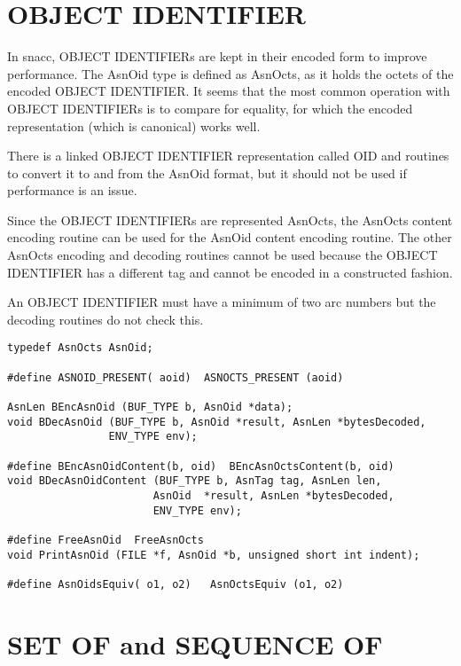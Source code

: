 \section{\label{oid-C-section}OBJECT IDENTIFIER}

In snacc, OBJECT IDENTIFIERs are kept in their encoded form to improve
performance.  The {\C AsnOid} type is defined as {\C AsnOcts}, as
it holds the octets of the encoded OBJECT IDENTIFIER\@.  It seems that
the most common operation with OBJECT IDENTIFIERs is to compare for
equality, for which the encoded representation (which is canonical)
works well.

There is a linked OBJECT IDENTIFIER representation called {\C OID}
and routines to convert it to and from the {\C AsnOid} format, but it
should not be used if performance is an issue.

Since the OBJECT IDENTIFIERs are represented {\C AsnOcts}, the
{\C AsnOcts} content encoding routine can be used for the
{\C AsnOid} content encoding routine.  The other {\C AsnOcts}
encoding and decoding routines cannot be used because the OBJECT
IDENTIFIER has a different tag and cannot be encoded in a constructed
fashion.

An OBJECT IDENTIFIER must have a minimum of two arc numbers but the
decoding routines do not check this.

\begin{small}
\begin{verbatim}
typedef AsnOcts AsnOid;

#define ASNOID_PRESENT( aoid)  ASNOCTS_PRESENT (aoid)

AsnLen BEncAsnOid (BUF_TYPE b, AsnOid *data);
void BDecAsnOid (BUF_TYPE b, AsnOid *result, AsnLen *bytesDecoded,
                ENV_TYPE env);

#define BEncAsnOidContent(b, oid)  BEncAsnOctsContent(b, oid)
void BDecAsnOidContent (BUF_TYPE b, AsnTag tag, AsnLen len,
                       AsnOid  *result, AsnLen *bytesDecoded,
                       ENV_TYPE env);

#define FreeAsnOid  FreeAsnOcts
void PrintAsnOid (FILE *f, AsnOid *b, unsigned short int indent);

#define AsnOidsEquiv( o1, o2)   AsnOctsEquiv (o1, o2)
\end{verbatim}
\end{small}


\section{\label{list-C-section}SET OF and SEQUENCE OF}

